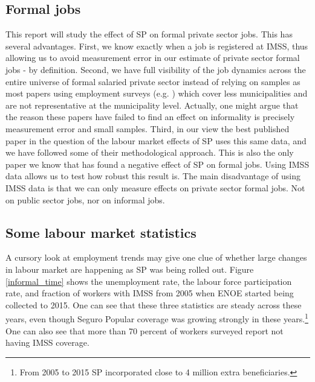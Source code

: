 \documentclass[oneside,11pt]{article}
\begin{document}
\subsection{Formal jobs} 

This report will study the effect of SP on formal private sector jobs. This has several advantages. First, we know exactly when a job is registered at IMSS, thus allowing us to avoid measurement error in our estimate of private sector formal jobs - by definition. Second, we have full visibility of the job dynamics across the entire universe of formal salaried private sector instead of relying on samples as most papers using employment surveys (e.g. \cite{Azuara}) which cover less municipalities and are not representative at the municipality level. Actually, one might argue that the reason these papers have failed to find an effect on informality is precisely measurement error and small samples. Third, in our view the best published paper in the question of the labour market effects of SP uses this same data, and we have followed some of their methodological approach. This is also the only paper we know that has found a negative effect of SP on formal jobs. Using IMSS data allows us to test how robust this result is. The main disadvantage of using IMSS data is that we can only measure effects on private sector formal jobs. Not on public sector jobs, nor on informal jobs. 


\subsection{Some labour market statistics}

A cursory look at employment trends may give one clue of whether large changes in labour market are happening as SP was being rolled out. Figure \ref{informal_time} shows the unemployment rate, the labour force participation rate, and fraction of workers with IMSS from 2005 when ENOE started being collected to 2015. One can see that these three statistics are steady across these years, even though Seguro Popular coverage was growing strongly in these years.\footnote{From 2005 to 2015 SP incorporated close to 4 million extra beneficiaries.} One can also see that more than 70 percent of workers surveyed report not having IMSS coverage.   
\end{document}
